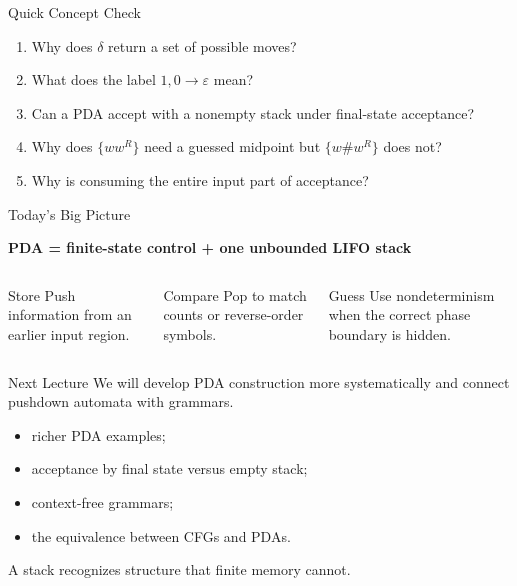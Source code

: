 \documentclass[aspectratio=169,10pt]{beamer}
\newcommand{\eps}{\varepsilon}
\begin{document}
\begin{frame}{Quick Concept Check}
\begin{enumerate}
    \item Why does $\delta$ return a set of possible moves?
    \item What does the label $1,0\to\eps$ mean?
    \item Can a PDA accept with a nonempty stack under final-state acceptance?
    \item Why does $\{ww^R\}$ need a guessed midpoint but $\{w\#w^R\}$ does not?
    \item Why is consuming the entire input part of acceptance?
\end{enumerate}
\end{frame}

\begin{frame}{Today’s Big Picture}
\begin{center}
\Large
\textbf{PDA = finite-state control + one unbounded LIFO stack}
\end{center}

\vspace{1em}
\begin{columns}[T,onlytextwidth]
\begin{block}{Store}
Push information from an earlier input region.
\end{block}

\begin{exampleblock}{Compare}
Pop to match counts or reverse-order symbols.
\end{exampleblock}

\begin{alertblock}{Guess}
Use nondeterminism when the correct phase boundary is hidden.
\end{alertblock}
\end{columns}
\end{frame}

\begin{frame}{Next Lecture}
We will develop PDA construction more systematically and connect pushdown automata with grammars.

\vspace{0.8em}
\begin{itemize}
    \item richer PDA examples;
    \item acceptance by final state versus empty stack;
    \item context-free grammars;
    \item the equivalence between CFGs and PDAs.
\end{itemize}

\vfill
\centering
\Large A stack recognizes structure that finite memory cannot.
\end{frame}
\end{document}
